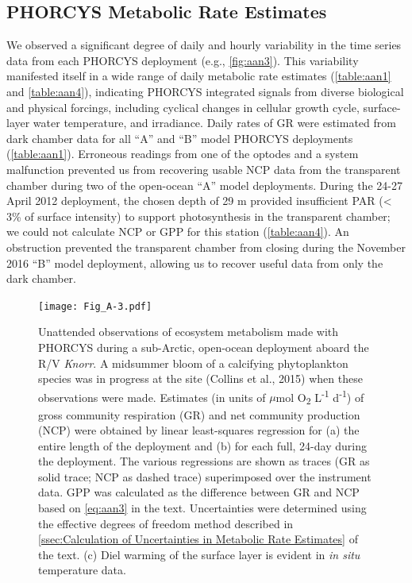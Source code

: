 \subsection{PHORCYS Metabolic Rate Estimates}
We observed a significant degree of daily and hourly variability in the time series data from each PHORCYS deployment (e.g., \autoref{fig:aan3}). This variability manifested itself in a wide range of daily metabolic rate estimates (\autoref{table:aan1} and \autoref{table:aan4}), indicating PHORCYS integrated signals from diverse biological and physical forcings, including cyclical changes in cellular growth cycle, surface-layer water temperature, and irradiance. Daily rates of GR were estimated from dark chamber data for all ``A'' and ``B'' model PHORCYS deployments (\autoref{table:aan1}). Erroneous readings from one of the optodes and a system malfunction prevented us from recovering usable NCP data from the transparent chamber during two of the open-ocean ``A'' model deployments. During the 24-27 April 2012 deployment, the chosen depth of 29 m provided insufficient PAR (\textless{} 3\% of surface intensity) to support photosynthesis in the transparent chamber; we could not calculate NCP or GPP for this station (\autoref{table:aan4}). An obstruction prevented the transparent chamber from closing during the November 2016 ``B'' model deployment, allowing us to recover useful data from only the dark chamber.
\begin{figure}[!t]
\centering
\texttt{[image: Fig\_A-3.pdf]}
\caption[Unattended observations of ecosystem metabolism made with the PHORCYS at a sub-Arctic site]{Unattended observations of ecosystem metabolism made with PHORCYS during a sub-Arctic, open-ocean deployment aboard the R/V \emph{Knorr}. A midsummer bloom of a calcifying phytoplankton species was in progress at the site (Collins et al., 2015) when these observations were made. Estimates (in units of $\mu$mol O\textsubscript{2} L\textsuperscript{-1} d\textsuperscript{-1}) of gross community respiration (GR) and net community production (NCP) were obtained by linear least-squares regression for (a) the entire length of the deployment and (b) for each full, 24-day during the deployment. The various regressions are shown as traces (GR as solid trace; NCP as dashed trace) superimposed over the instrument data. GPP was calculated as the difference between GR and NCP based on \autoref{eq:aan3} in the text. Uncertainties were determined using the effective degrees of freedom method described in \autoref{ssec:Calculation of Uncertainties in Metabolic Rate Estimates} of the text. (c) Diel warming of the surface layer is evident in \emph{in situ} temperature data.
}
\label{fig:aan3}
\end{figure}

